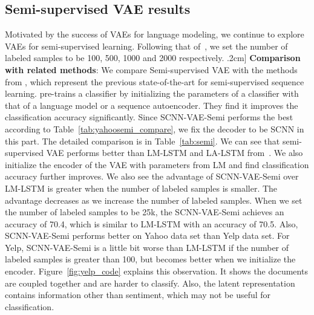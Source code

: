 \documentclass{article}
\begin{document}
\subsection{Semi-supervised VAE results}
Motivated by the success of VAEs for language modeling, we continue to explore
VAEs for semi-supervised learning. Following that of~\cite{kingma2014semi},
we set the number of labeled samples to be 100, 500, 1000 and 2000 respectively.
\0.2cm]
{\bf Comparison with related methods}: We compare Semi-supervised VAE with the
methods from \cite{dai2015semi}, which represent the previous state-of-the-art for semi-supervised
sequence learning. \citet{dai2015semi} pre-trains a classifier by initializing the parameters
of a classifier with that of a language model or a sequence autoencoder. They find it improves
the classification accuracy significantly. Since SCNN-VAE-Semi performs the best
according to Table~\ref{tab:yahoosemi_compare}, we fix
the decoder to be SCNN in this part. The detailed comparison is in
Table~\ref{tab:semi}. We can see that semi-supervised VAE performs better than LM-LSTM and
LA-LSTM from~\cite{dai2015semi}. We also initialize the encoder of the VAE with parameters
from LM and find classification accuracy further improves.
We also see the advantage of SCNN-VAE-Semi
over LM-LSTM is greater when the number of labeled samples is smaller. The
advantage decreases as we increase the number of labeled samples. When we
set the number of labeled samples to be 25k, the SCNN-VAE-Semi achieves an accuracy of 70.4,
which is similar to LM-LSTM with an accuracy of 70.5. Also, SCNN-VAE-Semi performs better on Yahoo
data set than Yelp data set. For Yelp, SCNN-VAE-Semi is a little bit worse than LM-LSTM
if the number of labeled samples is greater than 100, but becomes better when we initialize the encoder.
Figure~\ref{fig:yelp_code} explains this observation. It shows the documents are coupled
together and are harder to classify. Also, the latent representation contains
information other than sentiment, which may not be useful for classification.
\end{document}
